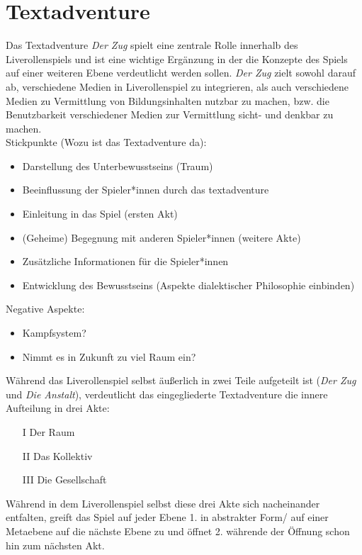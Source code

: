 \documentclass[a4paper, 12pt]{scrartcl}
\begin{document}
    \section{Textadventure} \label{textadventure} 
    Das Textadventure \textit{Der Zug} spielt eine zentrale Rolle innerhalb des Liverollenspiels und ist eine wichtige Ergänzung in der die Konzepte des Spiels auf einer weiteren Ebene verdeutlicht werden sollen. 
    \textit{Der Zug} zielt sowohl darauf ab, verschiedene Medien in Liverollenspiel zu integrieren, als auch verschiedene Medien zu Vermittlung von Bildungsinhalten nutzbar zu machen, bzw. die Benutzbarkeit verschiedener Medien zur Vermittlung sicht- und denkbar zu machen.\\
    Stickpunkte (Wozu ist das Textadventure da):
    \begin{itemize}
    \item Darstellung des Unterbewusstseins (Traum)
    \item Beeinflussung der Spieler*innen durch das textadventure
    \item Einleitung in das Spiel (ersten Akt)
    \item (Geheime) Begegnung mit anderen Spieler*innen (weitere Akte)
    \item Zusätzliche Informationen für die Spieler*innen
    \item Entwicklung des Bewusstseins (Aspekte dialektischer Philosophie einbinden)
    \end{itemize}
    Negative Aspekte:
    \begin{itemize}
    \item Kampfsystem?
    \item Nimmt es in Zukunft zu viel Raum ein? 
    \end{itemize}
    Während das Liverollenspiel selbst äußerlich in zwei Teile aufgeteilt ist (\textit{Der Zug} und \textit{Die Anstalt}), verdeutlicht das eingegliederte Textadventure die innere Aufteilung in drei Akte: 
    \begin{itemize}
    \item[I] Der Raum
    \item[II] Das Kollektiv 
    \item[III] Die Gesellschaft
    \end{itemize}
    Während in dem Liverollenspiel selbst diese drei Akte sich nacheinander entfalten, greift das Spiel auf jeder Ebene 1. in abstrakter Form/ auf einer Metaebene auf die nächste Ebene zu und öffnet 2. währende der Öffnung schon hin zum nächsten Akt. \\
\end{document}
